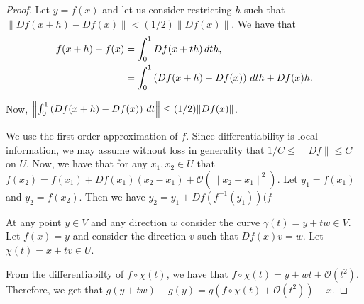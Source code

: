 \begin{proof}
Let $y = f(x)$ and let us consider restricting $h$ such that $\|Df(x+h)-Df(x)\|<(1/2)\|Df(x)\|$. We have that 
\begin{align}
f(x+h) - f(x) & = \int_0^1 Df(x+ th) \, dt h,\\
&  = \int_0^1 \left(Df(x+h) - Df(x)\right)\, dt h + Df(x)h.
\end{align}

Now, $\left\|\int_0^1 \left(Df(x+h) - Df(x)\right)\, dt\right\| \leq (1/2) \|Df(x)\|$.

We use the first order approximation of $f$. Since differentiability is local information, we may assume without loss in generality that $1/C \leq \|Df\| \leq C$ on $U$. Now, we have that for any $x_1, x_2 \in U$ that $f(x_2) = f(x_1) + Df(x_1) (x_2 - x_1) + \mathcal O(\|x_2 - x_1\|^2)$. Let $y_1 = f(x_1)$ and $y_2 = f(x_2)$. Then we have $y_2 = y_1 + Df(f^{-1}(y_1)) (f$

At any point $y\in V$ and any direction $w$ consider the curve $\gamma(t) = y + tw \in V$. Let $f(x) = y$ and consider the direction $v$ such that $Df(x)v = w$. Let $\chi(t) = x + tv \in U$.

From the differentiabilty of $f\circ \chi(t)$, we have that $f\circ \chi(t)  = y + wt + \mathcal O(t^2).$ Therefore, we get that $g(y+tw) - g(y) = g(f\circ\chi(t) + \mathcal O(t^2)) - x$.
\end{proof}